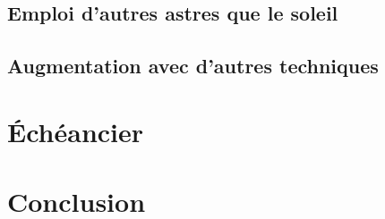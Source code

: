 \documentclass{report}
\begin{document}
\subsection{Emploi d'autres astres que le soleil}

\subsection{Augmentation avec d'autres techniques}


\section{Échéancier}


\section{Conclusion}\label{conclusion}


{\small
%

}
\end{document}
